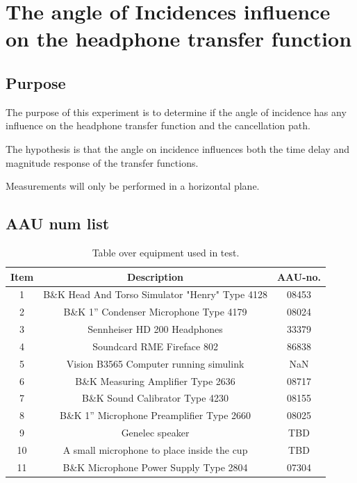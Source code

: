 
\section{The angle of Incidences influence on the headphone transfer function}

\subsection{Purpose}
The purpose of this experiment is to determine if the angle of incidence has any influence on the headphone transfer function and the cancellation path. 

The hypothesis is that the angle on incidence influences both the time delay and magnitude response of the transfer functions.

Measurements will only be performed in a horizontal plane. 

\subsection{AAU num list}
\begin{table}[H]
	\centering
	\begin{tabular}{ c c c } \toprule
		{Item}	& {Description} 						& {AAU-no}. \\ \bottomrule 
		1	&	B\&K Head And Torso Simulator "Henry" Type 4128	& 08453		\\
		2	&	B\&K 1'' Condenser Microphone Type 4179 	& 08024\\
		3	&	Sennheiser HD 200	Headphones				& 33379		\\
		4	&	Soundcard RME Fireface 802					& 86838		\\
		5	&	Vision B3565 Computer running simulink		& NaN		\\
		6	&	B\&K Measuring Amplifier Type 2636			& 08717		\\
		7	&	B\&K Sound Calibrator Type 4230				& 08155		\\ 
		8	&	B\&K 1'' Microphone Preamplifier Type 2660	& 08025		\\
		9	&	Genelec speaker								& TBD		\\ 
		10	&	A small microphone to place inside the cup	& TBD\\
		11	& 	B\&K Microphone Power Supply Type 2804		& 07304		\\
		\bottomrule
	\end{tabular}
	\caption{Table over equipment used in test.}
	\label{tab:AngleOfIncideceHP}
\end{table}

